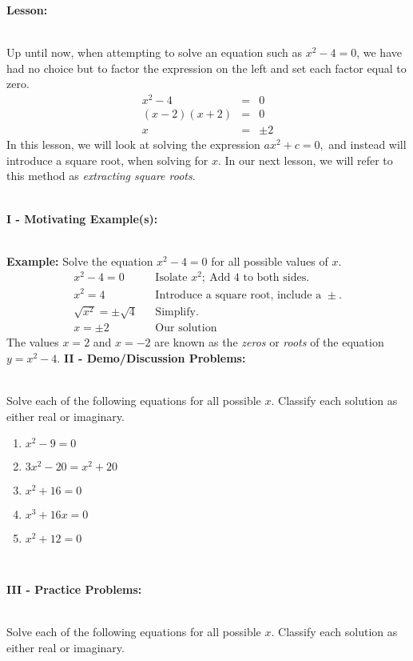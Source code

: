 \documentclass[12pt]{article}
\theoremstyle{definition}
\begin{document}
{\bf Lesson:}\\
\ \par
Up until now, when attempting to solve an equation such as $x^2-4=0$, we have had no choice but to factor the expression on the left and set each factor equal to zero.
\begin{eqnarray*}
	x^2-4 & = & 0\\
	(x-2)(x+2) & = & 0\\
	x & = &\pm 2
\end{eqnarray*}
In this lesson, we will look at solving the expression $ax^2+c=0,$ and instead will introduce a square root, when solving for $x$.  In our next lesson, we will refer to this method as {\it extracting square roots}.\\
\ \par
{\bf I - Motivating Example(s):}\\
\ \par
{\bf Example:} Solve the equation $x^2-4=0$ for all possible values of $x$.
\begin{eqnarray*}
x^2-4=0 & & \text{Isolate \ } x^2; \ \text{Add 4 to both sides.}\\
x^2=4 & & \text{Introduce a square root, include a \ } \pm.\\
\sqrt{x^2}=\pm\sqrt{4} & & \text{Simplify.}\\
x=\pm 2 & & \text{Our~solution}
\end{eqnarray*}
The values $x=2$ and $x=-2$ are known as the {\it zeros} or {\it roots} of the equation $y=x^2-4$.
\newpage
{\bf II - Demo/Discussion Problems:}\\
\ \par
Solve each of the following equations for all possible $x$.  Classify each solution as either real or imaginary.
\begin{enumerate}
	\item $x^2-9=0$
	\item $3x^2-20=x^2+20$
	\item $x^2+16=0$
	\item $x^3+16x=0$
	\item $x^2+12=0$
	\end{enumerate}
\ \par
{\bf III - Practice Problems:}\\
\ \par
Solve each of the following equations for all possible $x$.  Classify each solution as either real or imaginary.
\end{document}
